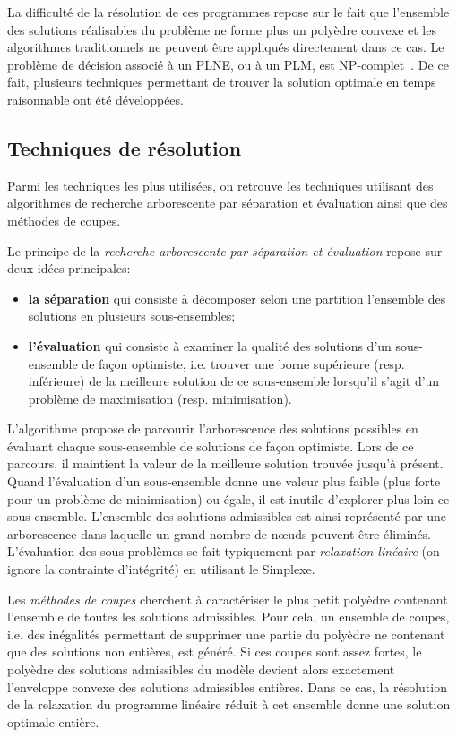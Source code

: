 La difficulté de la résolution de ces programmes repose sur le fait
que l'ensemble des solutions réalisables du problème ne forme plus un
polyèdre convexe et les algorithmes traditionnels ne peuvent être
appliqués directement dans ce cas. Le problème de décision associé à
un PLNE, ou à un PLM, est NP-complet~\cite{NP_bible}. De ce fait,
plusieurs techniques permettant de trouver la solution optimale en
temps raisonnable ont été développées.

\subsection{Techniques de résolution}

Parmi les techniques les plus utilisées, on retrouve les techniques
utilisant des algorithmes de recherche arborescente par séparation et
évaluation ainsi que des méthodes de coupes.

Le principe de la {\it recherche arborescente par séparation et
évaluation} repose sur deux idées principales: 
\begin{itemize}
\item {\bf la séparation} qui consiste à décomposer selon une
partition l'ensemble des solutions en plusieurs sous-ensembles;
\item {\bf l'évaluation} qui consiste à examiner la qualité des
solutions d'un sous-ensemble de façon optimiste, i.e. trouver une
borne supérieure (resp. inférieure) de la meilleure solution de ce
sous-ensemble lorsqu'il s'agit d'un problème de maximisation
(resp. minimisation).
\end{itemize} 
L’algorithme propose de parcourir l’arborescence des solutions
possibles en évaluant chaque sous-ensemble de solutions de façon
optimiste. Lors de ce parcours, il maintient la valeur de la meilleure
solution trouvée jusqu’à présent. Quand l’évaluation d’un
sous-ensemble donne une valeur plus faible (plus forte pour un
problème de minimisation) ou égale, il est inutile d’explorer plus loin ce
sous-ensemble. L’ensemble des solutions admissibles est ainsi
représenté par une arborescence dans laquelle un grand nombre de nœuds
peuvent être éliminés. L’évaluation des sous-problèmes se fait
typiquement par {\it relaxation linéaire} (on ignore la contrainte
d’intégrité) en utilisant le Simplexe.

Les {\it méthodes de coupes} cherchent à caractériser le plus petit
polyèdre contenant l'ensemble de toutes les solutions
admissibles. Pour cela, un ensemble de coupes, i.e. des inégalités
permettant de supprimer une partie du polyèdre ne contenant que des
solutions non entières, est généré. Si ces coupes sont assez fortes,
le polyèdre des solutions admissibles du modèle devient alors
exactement l'enveloppe convexe des solutions admissibles
entières. Dans ce cas, la résolution de la relaxation du programme
linéaire  réduit à cet ensemble donne une solution optimale
entière.

